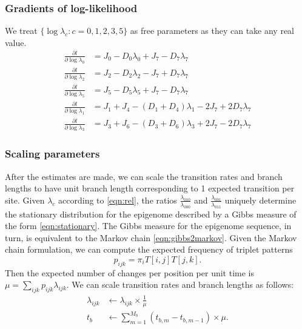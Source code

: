 \documentclass[11pt]{article}
\begin{document}
\subsubsection{Gradients of log-likelihood}
We treat $\{\log\lambda_c: c = 0,1,2,3,5\}$ as free parameters as they can take any real value.
\begin{equation}
  \begin{aligned}
    \frac{\partial l}{\partial \log\lambda_0} &= J_0 - D_0\lambda_0 + J_7 - D_7\lambda_7\\
    \frac{\partial l}{\partial \log\lambda_2} &= J_2 - D_2\lambda_2 - J_7 + D_7\lambda_7 \\
    \frac{\partial l}{\partial \log\lambda_5} &= J_5 - D_5\lambda_5 + J_7 - D_7\lambda_7\\
    \frac{\partial l}{\partial \log\lambda_1} &= J_1 + J_4 - (D_1 + D_4)\lambda_1 - 2J_7 + 2D_7\lambda_7\\
    \frac{\partial l}{\partial \log\lambda_3} &= J_3 + J_6 - (D_3 + D_6)\lambda_3 + 2J_7 - 2D_7\lambda_7
  \end{aligned}
\end{equation}

\subsubsection{Scaling parameters}
After the estimates are made, we can scale the transition rates and
branch lengths to have unit branch length corresponding to 1 expected
transition per site.  Given $\lambda_{c}$ according to
\eqref{eqn:rel}, the ratios $\frac{\lambda_{010}}{\lambda_{000}}$ and
$\frac{\lambda_{001}}{\lambda_{011}}$ uniquely determine the
stationary distribution for the epigenome described by a Gibbs measure
of the form \eqref{eqn:stationary}. The Gibbs measure for the
epigenome sequence, in turn, is equivalent to the Markov chain
\eqref{eqn:gibbs2markov}. Given the Markov chain formulation, we can
compute the expected frequency of triplet patterns
\[
p_{ijk} = \pi_i T[i,j] T[j,k].
\]
Then the expected number of changes per position per
unit time is $\mu = \sum_{ijk}p_{ijk}\lambda_{ijk}$. We can scale transition
rates and branch lengths as follows:
\begin{equation}\label{eqn:tidentifiable}
  \begin{aligned}
    \lambda_{ijk} &\leftarrow \lambda_{ijk}\times \frac{1}{\mu} \\
    t_b &\leftarrow \sum\limits_{m=1}^{M_b} (t_{b,m} - t_{b,m-1}) \times \mu.
  \end{aligned}
\end{equation}
\end{document}
